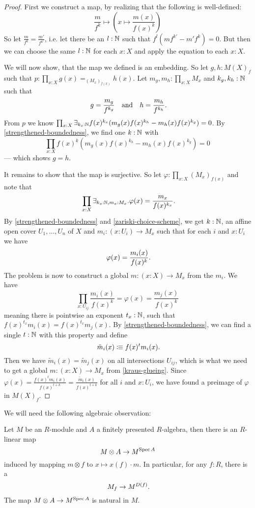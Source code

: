 \begin{proof}
First we construct a map, by realizing that the following is well-defined:
\[
  \frac{m}{f^k}\mapsto\left(x\mapsto \frac{m(x)}{f(x)^k}\right)
\]
So let $\frac{m}{f^k}=\frac{m'}{f^{k'}}$,
i.e. let there be an $l:\mathbb{N}$ such that $f^l(mf^{k'}-m'f^k)=0$.
But then we can choose the same $l:\mathbb{N}$ for each $x:X$
and apply the equation to each $x:X$.

We will now show, that the map we defined is an embedding.
So let $g,h:M(X)_f$ such that $p:\prod_{x:X}g(x)=_{(M_x)_{f(x)}}h(x)$.
Let $m_g,m_h:\prod_{x:X} M_x$ and $k_g,k_h:\mathbb{N}$ such that
\[
  g=\frac{m_g}{f^{k_g}} \quad\text{and}\quad h=\frac{m_h}{f^{k_h}}
  \rlap{.}
\]
From $p$ we know $\prod_{x:X}\exists_{k_x:\mathbb{N}}f(x)^{k_x}(m_g(x)f(x)^{k_h}-m_h(x)f(x)^{k_g})=0$.
By \cref{strengthened-boundedness},
we find one $k : \mathbb{N}$ with
\[
  \prod_{x:X}f(x)^{k}(m_g(x)f(x)^{k_h}-m_h(x)f(x)^{k_g})=0
\]
--- which shows $g=h$.

It remains to show that the map is surjective.
So let $\varphi:\prod_{x:X}(M_x)_{f(x)}$ and
note that
\[
  \prod_{x:X}
  \exists_{k_x:\N,m_x:M_x}.
  \varphi(x)=\frac{m_x}{f(x)^{k_x}}
  \rlap{.}
\]
By \cref{strengthened-boundedness} and \cref{zariski-choice-scheme},
we get $k:\mathbb{N}$, an affine open cover $U_1,\dots,U_n$ of $X$ and $m_i:(x : U_i)\to M_x$
such that for each $i$ and $x:U_i$ we have
\[
  \varphi(x)=\frac{m_i(x)}{f(x)^{k}}
  \rlap{.}
\]
The problem is now to construct a global $m:(x:X)\to M_x$ from the $m_i$.
We have
\[
    \prod_{x:U_{ij}}\frac{m_i(x)}{f(x)^k}=\varphi(x)=\frac{m_j(x)}{f(x)^k}
\]
meaning there is pointwise an exponent $t_x:\mathbb{N}$,
such that $f(x)^{t_x}m_i(x)=f(x)^{t_x}m_j(x)$.
By \cref{strengthened-boundedness},
we can find a single $t:\mathbb{N}$ with this property and define
\[
  \tilde{m}_i(x) \colonequiv f(x)^t m_i(x)
  \rlap{.}
\]
Then we have $\tilde{m}_i(x)=\tilde{m}_j(x)$ on all intersections $U_{ij}$,
which is what we need to get a global $m:(x:X)\to M_x$ from \cref{kraus-glueing}.
Since $\varphi(x)=\frac{f(x)^t m_i(x)}{f(x)^{t+k}}=\frac{\tilde{m}_i(x)}{f(x)^{t+k}}$
for all $i$ and $x : U_i$,
we have found a preimage of $\varphi$ in $M(X)_f$.
\end{proof}

We will need the following algebraic observation:

\begin{remark}%
  \label{localization-to-module-if-non-zero}
  Let $M$ be an $R$-module and $A$ a finitely presented $R$-algebra,
  then there is an $R$-linear map
  \[
    M\otimes A\to M^{\operatorname{Spec} A}
  \]
  induced by mapping $m\otimes f$ to $x\mapsto x(f)\cdot m$.
  In particular, for any $f:R$, there is a
  \[
    M_f\to M^{D(f)}
    \rlap{.}
  \]
  The map $M\otimes A\to M^{\operatorname{Spec} A}$ is natural in $M$.
\end{remark}

